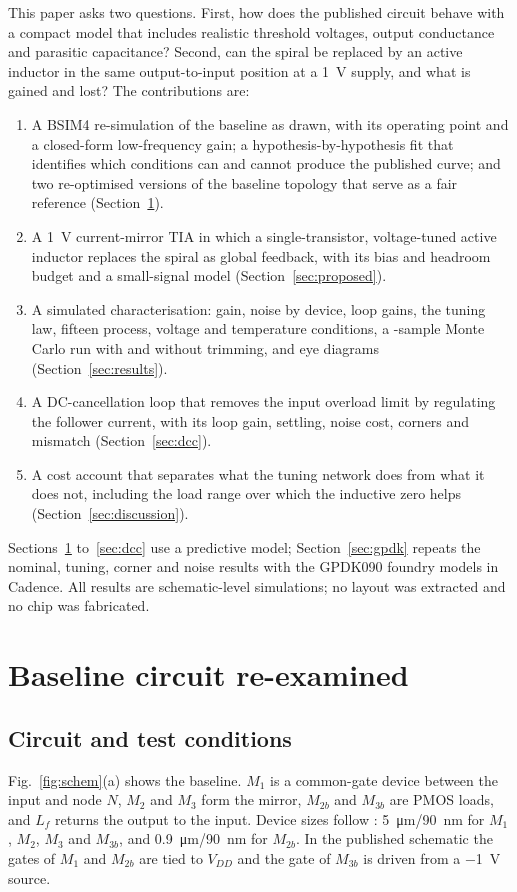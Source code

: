 \documentclass[11pt,a4paper]{article}
\begin{document}
This paper asks two questions. First, how does the published circuit behave with a compact model that includes realistic threshold voltages, output conductance and parasitic capacitance? Second, can the spiral be replaced by an active inductor in the same output-to-input position at a \SI{1}{V} supply, and what is gained and lost? The contributions are:
\begin{enumerate}
\item A BSIM4 re-simulation of the baseline as drawn, with its operating point and a closed-form low-frequency gain; a hypothesis-by-hypothesis fit that identifies which conditions can and cannot produce the published curve; and two re-optimised versions of the baseline topology that serve as a fair reference (Section~\ref{sec:baseline}).
\item A \SI{1}{V} current-mirror TIA in which a single-transistor, voltage-tuned active inductor replaces the spiral as global feedback, with its bias and headroom budget and a small-signal model (Section~\ref{sec:proposed}).
\item A simulated characterisation: gain, noise by device, loop gains, the tuning law, fifteen process, voltage and temperature conditions, a \McN-sample Monte Carlo run with and without trimming, and eye diagrams (Section~\ref{sec:results}).
\item A DC-cancellation loop that removes the input overload limit by regulating the follower current, with its loop gain, settling, noise cost, corners and mismatch (Section~\ref{sec:dcc}).
\item A cost account that separates what the tuning network does from what it does not, including the load range over which the inductive zero helps (Section~\ref{sec:discussion}).
\end{enumerate}
Sections~\ref{sec:baseline} to~\ref{sec:dcc} use a predictive model; Section~\ref{sec:gpdk} repeats the nominal, tuning, corner and noise results with the GPDK090 foundry models in Cadence. All results are schematic-level simulations; no layout was extracted and no chip was fabricated.

\section{Baseline circuit re-examined}\label{sec:baseline}
\subsection{Circuit and test conditions}
Fig.~\ref{fig:schem}(a) shows the baseline. $M_1$ is a common-gate device between the input and node $N$, $M_2$ and $M_3$ form the mirror, $M_{2b}$ and $M_{3b}$ are PMOS loads, and $L_f$ returns the output to the input. Device sizes follow \cite{baseline}: \SI{5}{\micro m}/\SI{90}{nm} for $M_1$, $M_2$, $M_3$ and $M_{3b}$, and \SI{0.9}{\micro m}/\SI{90}{nm} for $M_{2b}$. In the published schematic the gates of $M_1$ and $M_{2b}$ are tied to $V_{DD}$ and the gate of $M_{3b}$ is driven from a \SI{-1}{V} source.
\end{document}
